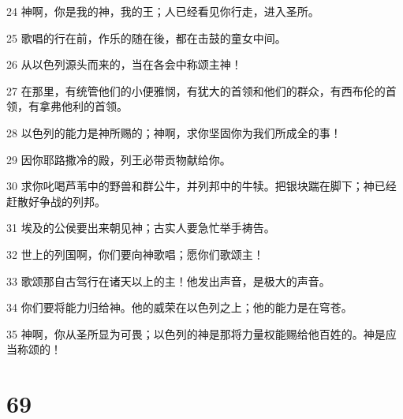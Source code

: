 \par 24 神啊，你是我的神，我的王；人已经看见你行走，进入圣所。
\par 25 歌唱的行在前，作乐的随在後，都在击鼓的童女中间。
\par 26 从以色列源头而来的，当在各会中称颂主神！
\par 27 在那里，有统管他们的小便雅悯，有犹大的首领和他们的群众，有西布伦的首领，有拿弗他利的首领。
\par 28 以色列的能力是神所赐的；神啊，求你坚固你为我们所成全的事！
\par 29 因你耶路撒冷的殿，列王必带贡物献给你。
\par 30 求你叱喝芦苇中的野兽和群公牛，并列邦中的牛犊。把银块踹在脚下；神已经赶散好争战的列邦。
\par 31 埃及的公侯要出来朝见神；古实人要急忙举手祷告。
\par 32 世上的列国啊，你们要向神歌唱；愿你们歌颂主！
\par 33 歌颂那自古驾行在诸天以上的主！他发出声音，是极大的声音。
\par 34 你们要将能力归给神。他的威荣在以色列之上；他的能力是在穹苍。
\par 35 神啊，你从圣所显为可畏；以色列的神是那将力量权能赐给他百姓的。神是应当称颂的！

\chapter{69}

